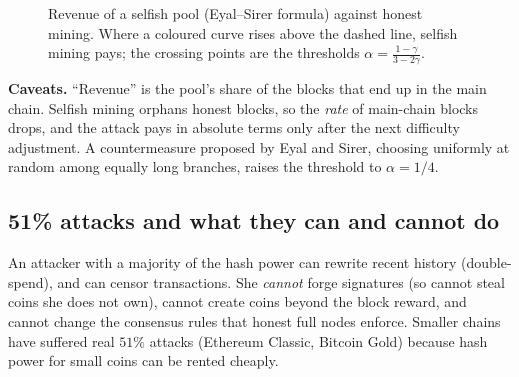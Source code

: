 \documentclass[11pt,a4paper]{article}
\newenvironment{plainenglish}{\par\smallskip}{\par\smallskip}
\theoremstyle{definition}
\theoremstyle{plain}
\theoremstyle{remark}
\begin{document}
\begin{figure}[htbp]
\centering
{}
\caption{Revenue of a selfish pool (Eyal--Sirer formula) against honest mining. Where a coloured curve rises above the dashed line, selfish mining pays; the crossing points are the thresholds $\alpha=\frac{1-\gamma}{3-2\gamma}$.}
\end{figure}

\noindent\textbf{Caveats.} ``Revenue'' is the pool's share of the blocks that end up in the main chain. Selfish mining orphans honest blocks, so the \emph{rate} of main-chain blocks drops, and the attack pays in absolute terms only after the next difficulty adjustment. A countermeasure proposed by Eyal and Sirer, choosing uniformly at random among equally long branches, raises the threshold to $\alpha=1/4$.

\subsection{51\% attacks and what they can and cannot do}

\begin{plainenglish}
An attacker with a majority of the hash power can rewrite recent history (double-spend), and can censor transactions. She \emph{cannot} forge signatures (so cannot steal coins she does not own), cannot create coins beyond the
block reward, and cannot change the consensus rules that honest full nodes enforce. Smaller chains have suffered real $51\%$ attacks (Ethereum Classic, Bitcoin Gold) because hash power for small coins can be rented cheaply.
\end{plainenglish}
\end{document}
